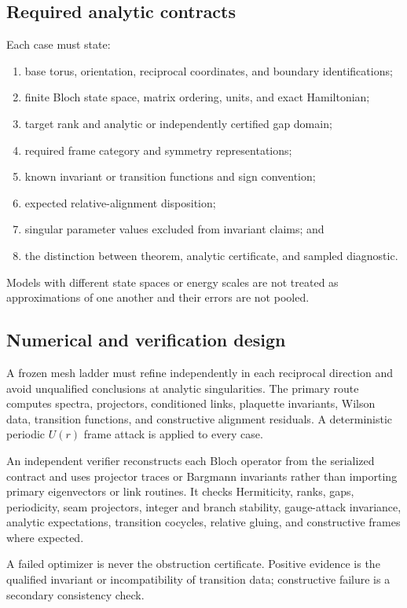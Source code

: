 \documentclass[11pt]{article}
\newenvironment{prospective}{\color{prospectivered}}{}
\begin{document}
\begin{prospective}
\subsection{Required analytic contracts}
Each case must state:
\begin{enumerate}
 \item base torus, orientation, reciprocal coordinates, and boundary identifications;
 \item finite Bloch state space, matrix ordering, units, and exact Hamiltonian;
 \item target rank and analytic or independently certified gap domain;
 \item required frame category and symmetry representations;
 \item known invariant or transition functions and sign convention;
 \item expected relative-alignment disposition;
 \item singular parameter values excluded from invariant claims; and
 \item the distinction between theorem, analytic certificate, and sampled diagnostic.
\end{enumerate}
Models with different state spaces or energy scales are not treated as approximations of
one another and their errors are not pooled.

\subsection{Numerical and verification design}
A frozen mesh ladder must refine independently in each reciprocal direction and avoid
unqualified conclusions at analytic singularities. The primary route computes spectra,
projectors, conditioned links, plaquette invariants, Wilson data, transition functions,
and constructive alignment residuals. A deterministic periodic $U(r)$ frame attack is
applied to every case.

An independent verifier reconstructs each Bloch operator from the serialized contract
and uses projector traces or Bargmann invariants rather than importing primary
eigenvectors or link routines. It checks Hermiticity, ranks, gaps, periodicity, seam
projectors, integer and branch stability, gauge-attack invariance, analytic expectations,
transition cocycles, relative gluing, and constructive frames where expected.

A failed optimizer is never the obstruction certificate. Positive evidence is the
qualified invariant or incompatibility of transition data; constructive failure is a
secondary consistency check.


\end{prospective}
\end{document}

